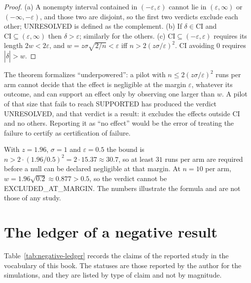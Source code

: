 \begin{proof}
(a) A nonempty interval contained in $(-\varepsilon,\varepsilon)$ cannot lie in $(\varepsilon,\infty)$ or $(-\infty,-\varepsilon)$, and those two are disjoint, so the first two verdicts exclude each other; \textsf{UNRESOLVED} is defined as the complement. (b) If $\delta\in\mathrm{CI}$ and $\mathrm{CI}\subseteq(\varepsilon,\infty)$ then $\delta>\varepsilon$; similarly for the others. (c) $\mathrm{CI}\subseteq(-\varepsilon,\varepsilon)$ requires its length $2w<2\varepsilon$, and $w=z\sigma\sqrt{2/n}<\varepsilon$ iff $n>2(z\sigma/\varepsilon)^2$. $\mathrm{CI}$ avoiding $0$ requires $|\widehat\delta|>w$.
\end{proof}

The theorem formalizes ``underpowered'': a pilot with $n\le2(z\sigma/\varepsilon)^2$ runs per arm cannot decide that the effect is negligible at the margin $\varepsilon$, whatever its outcome, and can support an effect only by observing one larger than $w$. A pilot of that size that fails to reach \textsf{SUPPORTED} has produced the verdict \textsf{UNRESOLVED}, and that verdict is a result: it excludes the effects outside $\mathrm{CI}$ and no others. Reporting it as ``no effect'' would be the error of treating the failure to certify as certification of failure.

\begin{example}[Arithmetic]
With $z=1.96$, $\sigma=1$ and $\varepsilon=0.5$ the bound is $n>2\cdot(1.96/0.5)^2=2\cdot15.37\approx30.7$, so at least $31$ runs per arm are required before a null can be declared negligible at that margin. At $n=10$ per arm, $w=1.96\sqrt{0.2}\approx0.877>0.5$, so the verdict cannot be \textsf{EXCLUDED\_AT\_MARGIN}. The numbers illustrate the formula and are not those of any study.
\end{example}

\section{The ledger of a negative result}

Table~\ref{tab:negative-ledger} records the claims of the reported study in the vocabulary of this book. The statuses are those reported by the author for the simulations, and they are listed by type of claim and not by magnitude.

